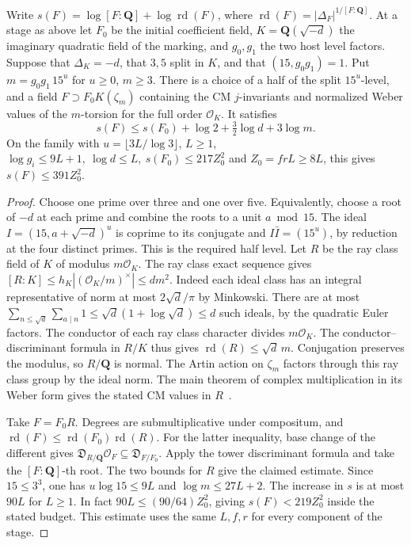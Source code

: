 \begin{proposition}\label{zetageo:field}
Write \(s(F)=\log[F:\mathbf Q]+\log\operatorname{rd}(F)\), where
\(\operatorname{rd}(F)=|\Delta_F|^{1/[F:\mathbf Q]}\).
At a stage as above let \(F_0\) be the initial coefficient field,
\(K=\mathbf Q(\sqrt{-d})\) the imaginary quadratic field of the
marking, and \(g_0,g_1\) the two host level factors. Suppose that
\(\Delta_K=-d\), that \(3,5\) split in \(K\), and that
\((15,g_0g_1)=1\). Put \(m=g_0g_1\,15^u\) for \(u\ge0\), \(m\ge3\).
There is a choice of a half of the split \(15^u\)-level, and a
field \(F\supset F_0K(\zeta_m)\) containing the CM \(j\)-invariants
and normalized Weber values of the \(m\)-torsion for the full order
\(\mathcal O_K\). It satisfies
\[
 s(F)\le s(F_0)+\log 2+\tfrac32\log d+3\log m.
\]
On the family with \(u=\lfloor3L/\log3\rfloor\), \(L\ge1\),
\(\log g_i\le9L+1,\ \log d\le L,\ s(F_0)\le217Z_0^2\) and
\(Z_0=frL\ge8L\), this gives \(s(F)\le391Z_0^2\).
\end{proposition}
\begin{proof}
Choose one prime over three and one over five. Equivalently, choose
a root of \(-d\) at each prime and combine the roots to a unit
\(a\bmod 15\). The ideal \(I=(15,a+\sqrt{-d})^u\) is coprime
to its conjugate and \(I\bar I=(15^u)\), by reduction at the four
distinct primes. This is the required half level.
Let \(R\) be the ray class field of \(K\) of modulus \(m\mathcal O_K\).
The ray class exact sequence gives
\([R:K]\le h_K|(\mathcal O_K/m)^\times|\le d m^2\).
Indeed each ideal class has an integral representative of norm
at most \(2\sqrt d/\pi\) by Minkowski. There are at most
\(\sum_{n\le\sqrt d}\sum_{a\mid n}1\le\sqrt d(1+\log\sqrt d)\le d\)
such ideals, by the quadratic Euler factors. The conductor of each
ray class character divides \(m\mathcal O_K\). The
conductor--discriminant formula in \(R/K\) thus gives
\(\operatorname{rd}(R)\le\sqrt d\,m\). Conjugation preserves the
modulus, so \(R/\mathbf Q\) is normal. The Artin action on
\(\zeta_m\) factors through this ray class group by the ideal norm.
The main theorem of complex multiplication in its Weber form gives
the stated CM values in \(R\)~\cite{coxCM}.

Take \(F=F_0R\). Degrees are submultiplicative under compositum, and
\(\operatorname{rd}(F)\le\operatorname{rd}(F_0)\operatorname{rd}(R)\).
For the latter inequality, base change of the different gives
\(\mathfrak D_{R/\mathbf Q}\mathcal O_F\subseteq
\mathfrak D_{F/F_0}\). Apply the tower discriminant formula and
take the \([F:\mathbf Q]\)-th root. The two bounds for \(R\) give the
claimed estimate. Since \(15\le3^3\), one has \(u\log15\le9L\) and
\(\log m\le27L+2\). The increase in \(s\) is at most \(90L\)
for \(L\ge1\). In fact \(90L\le(90/64)Z_0^2\), giving
\(s(F)<219Z_0^2\) inside the stated budget. This estimate uses
the same \(L,f,r\) for every component of the stage.
\end{proof}

